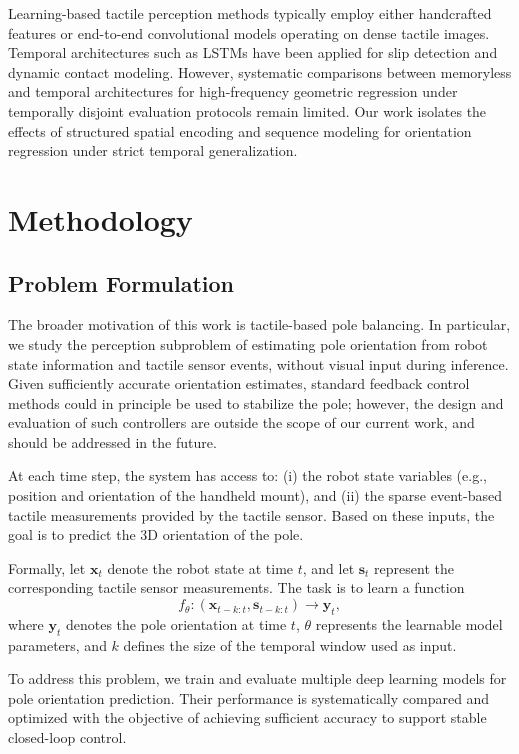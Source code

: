 \documentclass{article}
\begin{document}
    Learning-based tactile perception methods typically employ either handcrafted features or end-to-end convolutional models operating on dense tactile images\cite{gattung2025tactile}. Temporal architectures such as LSTMs have been applied for slip detection and dynamic contact modeling. However, systematic comparisons between memoryless and temporal architectures for high-frequency geometric regression under temporally disjoint evaluation protocols remain limited. Our work isolates the effects of structured spatial encoding and sequence modeling for orientation regression under strict temporal generalization.
    
\section{Methodology}
\subsection{Problem Formulation}
The broader motivation of this work is tactile-based pole balancing. In particular, we study the perception subproblem of estimating pole orientation from robot state information and tactile sensor events, without visual input during inference. Given sufficiently accurate orientation estimates, standard feedback control methods could in principle be used to stabilize the pole; however, the design and evaluation of such controllers are outside the scope of our current work, and should be addressed in the future.

At each time step, the system has access to: (i) the robot state variables
(e.g., position and orientation of the handheld mount),
and (ii) the sparse event-based tactile measurements provided by the tactile sensor.
Based on these inputs, the goal is to predict the 3D orientation of the pole.

Formally, let $\mathbf{x}_t$ denote the robot state at time $t$,
and let $\mathbf{s}_t$ represent the corresponding tactile sensor measurements.
The task is to learn a function
\[
f_\theta : (\mathbf{x}_{t-k:t}, \mathbf{s}_{t-k:t}) \rightarrow \mathbf{y}_t,
\]
where $\mathbf{y}_t$ denotes the pole orientation at time $t$,
$\theta$ represents the learnable model parameters,
and $k$ defines the size of the temporal window used as input.

To address this problem, we train and evaluate multiple deep learning models
for pole orientation prediction. Their performance is systematically compared
and optimized with the objective of achieving sufficient accuracy to support
stable closed-loop control.
\end{document}
